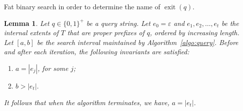 \documentclass[a4paper,11pt]{article}
\newtheorem{lemma}[theorem]{Lemma}
\newcommand{\eps}{\varepsilon}
\newcommand{\?}{\mskip1.5mu}
\DeclareMathOperator{\exit}{exit}
\begin{document}
\begin{algorithm}
\KwOut{the name of $\exit(q)$}
\If{$a = 0 \wedge e_\text{root}\neq\eps$}{%
  \Return $\eps$\;
} 
\caption{Fat binary search in order to 
  determine the name of $\exit(q)$.}
\label{algo:query}
\end{algorithm}

\begin{lemma}\label{lem:correctness}
Let $q \in \{0, 1\}^+$ be a query string.
Let $e_0 = \eps$ and $e_1, e_2, \dots, e_t$ be the internal 
extents of $T$ that are \emph{proper} prefixes of $q$, ordered by 
increasing length.  Let $[a, b]$ be the search interval maintained by 
Algorithm~\ref{algo:query}. Before and after each iteration, the 
following invariants are satisfied: 
\begin{enumerate}
    \item\label{enu:lema} $a = |e_j|$, for some $j$;
    \item\label{enu:lemb} $b > |e_t|$.
\end{enumerate}
It follows that when the algorithm terminates, we have, $a = |e_t|$.
\end{lemma}
\end{document}
